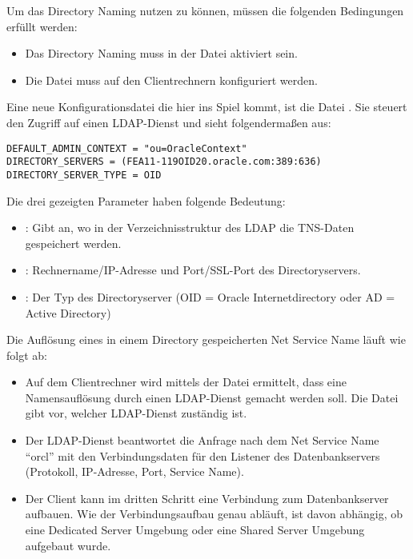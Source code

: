         Um das Directory Naming nutzen zu können, müssen die folgenden Bedingungen erfüllt werden:
\clearpage
        \begin{itemize}
          \item Das Directory Naming muss in der Datei  aktiviert sein.
          \item Die Datei  muss auf den Clientrechnern konfiguriert werden.
        \end{itemize}
        Eine neue Konfigurationsdatei die hier ins Spiel kommt, ist die Datei . Sie steuert den Zugriff auf einen LDAP-Dienst und sieht folgendermaßen aus:
        \begin{lstlisting}[caption={Die Datei ldap.ora},label=admin612,language=configfile]
DEFAULT_ADMIN_CONTEXT = "ou=OracleContext"
DIRECTORY_SERVERS = (FEA11-119OID20.oracle.com:389:636)
DIRECTORY_SERVER_TYPE = OID
        \end{lstlisting}
        Die drei gezeigten Parameter haben folgende Bedeutung:
        \begin{itemize}
          \item {}: Gibt an, wo in der Verzeichnisstruktur des LDAP die TNS-Daten gespeichert werden.
          \item {}: Rechnername/IP-Adresse und Port/SSL-Port des Directoryservers.
          \item {}: Der Typ des Directoryserver (OID = Oracle Internetdirectory oder AD = Active Directory)
        \end{itemize}

        Die Auflösung eines in einem Directory gespeicherten Net Service Name läuft wie folgt ab:


        \begin{itemize}
          \item Auf dem Clientrechner wird mittels der Datei  ermittelt, dass eine Namensauflösung durch einen LDAP-Dienst gemacht werden soll. Die Datei  gibt vor, welcher LDAP-Dienst zuständig ist.
          \item Der LDAP-Dienst beantwortet die Anfrage nach dem Net Service Name \enquote{orcl} mit den Verbindungsdaten für den Listener des Datenbankservers (Protokoll, IP-Adresse, Port, Service Name).
          \item Der Client kann im dritten Schritt eine Verbindung zum Datenbankserver aufbauen. Wie der Verbindungsaufbau genau abläuft, ist davon abhängig, ob eine Dedicated Server Umgebung oder eine Shared Server Umgebung aufgebaut wurde.
        \end{itemize}
